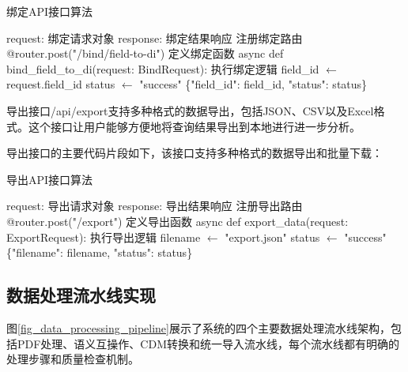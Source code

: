 \begin{algorithm}[H]
\caption{绑定API接口算法}
\begin{algorithmic}[1]
\REQUIRE request: 绑定请求对象
\ENSURE response: 绑定结果响应
\STATE 注册绑定路由
\STATE @router.post("/bind/field-to-di")
\STATE 定义绑定函数
\STATE async def bind\_field\_to\_di(request: BindRequest):
\STATE     执行绑定逻辑
\STATE     field\_id $\leftarrow$ request.field\_id
\STATE     status $\leftarrow$ "success"
\STATE     \RETURN \{"field\_id": field\_id, "status": status\}
\end{algorithmic}
\end{algorithm}

导出接口/api/export支持多种格式的数据导出，包括JSON、CSV以及Excel格式。这个接口让用户能够方便地将查询结果导出到本地进行进一步分析。

导出接口的主要代码片段如下，该接口支持多种格式的数据导出和批量下载：

\begin{algorithm}[H]
\caption{导出API接口算法}
\begin{algorithmic}[1]
\REQUIRE request: 导出请求对象
\ENSURE response: 导出结果响应
\STATE 注册导出路由
\STATE @router.post("/export")
\STATE 定义导出函数
\STATE async def export\_data(request: ExportRequest):
\STATE     执行导出逻辑
\STATE     filename $\leftarrow$ "export.json"
\STATE     status $\leftarrow$ "success"
\STATE     \RETURN \{"filename": filename, "status": status\}
\end{algorithmic}
\end{algorithm}

\subsection{数据处理流水线实现}

图\ref{fig_data_processing_pipeline}展示了系统的四个主要数据处理流水线架构，包括PDF处理、语义互操作、CDM转换和统一导入流水线，每个流水线都有明确的处理步骤和质量检查机制。

